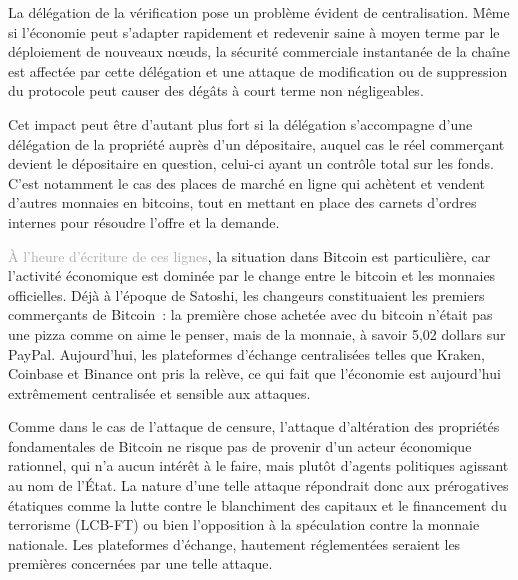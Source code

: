 La délégation de la vérification pose un problème évident de centralisation. Même si l'économie peut s'adapter rapidement et redevenir saine à moyen terme par le déploiement de nouveaux nœuds, la sécurité commerciale instantanée de la chaîne est affectée par cette délégation et une attaque de modification ou de suppression du protocole peut causer des dégâts à court terme non négligeables.

Cet impact peut être d'autant plus fort si la délégation s'accompagne d'une délégation de la propriété auprès d'un dépositaire, auquel cas le réel commerçant devient le dépositaire en question, celui-ci ayant un contrôle total sur les fonds. C'est notamment le cas des places de marché en ligne qui achètent et vendent d'autres monnaies en bitcoins, tout en mettant en place des carnets d'ordres internes pour résoudre l'offre et la demande.

\textcolor{darkgray}{À l'heure d'écriture de ces lignes}, la situation dans Bitcoin est particulière, car l'activité économique est dominée par le change entre le bitcoin et les monnaies officielles. Déjà à l'époque de Satoshi, les changeurs constituaient les premiers commerçants de Bitcoin~: la première chose achetée avec du bitcoin n'était pas une pizza comme on aime le penser, mais de la monnaie, à savoir 5,02 dollars sur PayPal. Aujourd'hui, les plateformes d'échange centralisées telles que Kraken, Coinbase et Binance ont pris la relève, ce qui fait que l'économie est aujourd'hui extrêmement centralisée et sensible aux attaques.

Comme dans le cas de l'attaque de censure, l'attaque d'altération des propriétés fondamentales de Bitcoin ne risque pas de provenir d'un acteur économique rationnel, qui n'a aucun intérêt à le faire, mais plutôt d'agents politiques agissant au nom de l'État. La nature d'une telle attaque répondrait donc aux prérogatives étatiques comme la lutte contre le blanchiment des capitaux et le financement du terrorisme (LCB-FT) ou bien l'opposition à la spéculation contre la monnaie nationale. Les plateformes d'échange, hautement réglementées seraient les premières concernées par une telle attaque.

